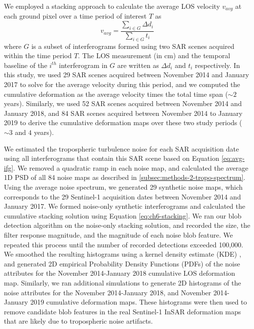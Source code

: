 We employed a stacking approach \cite{Sandwell1998PhaseGradientApproach, Staniewicz2020InsarRevealsComplex} to calculate the average LOS velocity $v_{avg}$ at each ground pixel over a time period of interest $ T $ as
\begin{equation}
	v_{avg} = \frac{\sum_{i \in G} \Delta d_i}{\sum_{i \in G} t_i}
	\label{eq:ch6-stacking}
\end{equation}
where $G$ is a subset of interferograms formed using two SAR scenes acquired within the time period $T$. The LOS measurement (in cm) and the temporal baseline of the $i^{th}$ interferogram in $G$ are written as $\Delta d_i$ and $ t_i $ respectively.
In this study, we used 29 SAR scenes acquired between November 2014 and January 2017 to solve for the average velocity during this period, and we computed the cumulative deformation as the average velocity times the total time span ($\sim 2$ years). Similarly, we used 52 SAR scenes acquired between November 2014 and January 2018, and 84 SAR scenes acquired between November 2014 to January 2019 to derive the cumulative deformation maps over these two study periods ($\sim 3$ and $4$ years).

We estimated the tropospheric turbulence noise for each SAR acquisition date using all interferograms that contain this SAR scene based on Equation \eqref{eq:avg-ifg}. We removed a quadratic ramp in each noise map, and calculated the average 1D PSD of all 84 noise maps as described in \ref{subsec:methods-2-tropo-spectrum}.
Using the average noise spectrum, we generated 29 synthetic noise maps, which corresponds to the 29 Sentinel-1 acquisition dates between November 2014 and January 2017. We formed noise-only synthetic interferograms and calculated the cumulative stacking solution using Equation \eqref{eq:ch6-stacking}. We ran our blob detection algorithm on the noise-only stacking solution, and recorded the size, the filter response magnitude, and the magnitude of each noise blob feature. We repeated this process until the number of recorded detections exceeded 100,000. We smoothed the resulting histograms using a kernel density estimate (KDE) \cite{Scott2015MultivariateDensityEstimation}, and generated 2D empirical Probability Density Functions (PDFs) of the noise attributes for the November 2014-January 2018 cumulative LOS deformation map.
Similarly, we ran additional simulations to generate 2D histograms of the noise attributes for the November 2014-January 2018, and November 2014-January 2019 cumulative deformation maps.
These histograms were then used to remove candidate blob features in the real Sentinel-1 InSAR deformation maps that are likely due to tropospheric noise artifacts.

